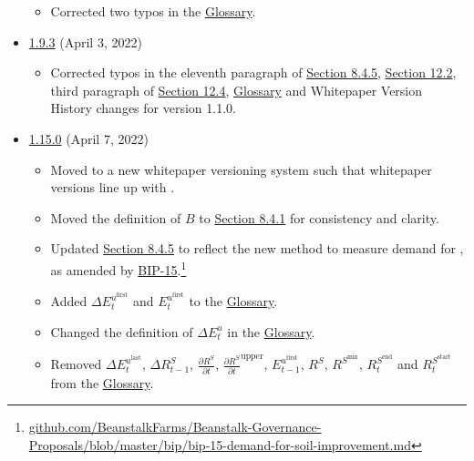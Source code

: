 \documentclass[class=article, crop=false]{standalone}
\begin{document}
\begin{itemize}[topsep=0pt, itemsep=3pt,leftmargin=16pt]
\begin{itemize}
        \item Corrected two typos in the \hyperlink{subsection.12.2}{Glossary}.
    \end{itemize}
         \item \href{https://github.com/BeanstalkFarms/Beanstalk/blob/master/version-history/beanstalk1_9_3.pdf}{1.9.3} (April 3, 2022)
    \begin{itemize}
        \item Corrected typos in the eleventh paragraph of \hyperlink{subsubsection.8.4.5}{Section 8.4.5}, \hyperlink{subsection.12.2}{Section 12.2}, third paragraph of \hyperlink{subsection.12.4}{Section 12.4}, \hyperlink{subsection.12.2}{Glossary} and Whitepaper Version History changes for version 1.1.0.
    \end{itemize}   
        \item \href{https://github.com/BeanstalkFarms/Beanstalk/blob/master/version-history/beanstalk1_15_0.pdf}{1.15.0} (April 7, 2022)
    \begin{itemize}
        \item Moved to a new whitepaper versioning system such that whitepaper versions line up with . 
        \item Moved the definition of $B$ to \hyperlink{subsubsection.8.4.1}{Section 8.4.1} for consistency and clarity. 
        \item Updated \hyperlink{subsubsection.8.4.5}{Section 8.4.5} to reflect the new method to measure demand for , as amended by \href{https://github.com/BeanstalkFarms/Beanstalk-Governance-Proposals/blob/master/bip/bip-15-demand-for-soil-improvement.md}{BIP-15}.\footnote{\href{https://github.com/BeanstalkFarms/Beanstalk-Governance-Proposals/blob/master/bip/bip-15-demand-for-soil-improvement.md}{github.com/BeanstalkFarms/Beanstalk-Governance-Proposals/blob/master/bip/bip-15-demand-for-soil-improvement.md}}
        \item Added  $\Delta E_{t}^{u^{\text{first}}}$ and $E_{t}^{u^{\text{first}}}$ to the \hyperlink{subsection.12.2}{Glossary}. 
        \item Changed the definition of $\Delta E_{t}^{u}$ in the \hyperlink{subsection.12.2}{Glossary}. 
        \item Removed $\Delta E_{t}^{u^{\text{last}}}$, $\Delta R_{t-1}^S$, $\frac{\partial R^S}{\partial t}$, $\frac{\partial R^S}{\partial t}^{\text{upper}}$, $E_{t-1}^{u^{\text{first}}}$, $R^S$, $R^{S^{\text{min}}}$, $R_t^{S^{\text{end}}}$ and $R_t^{S^{\text{start}}}$ from the \hyperlink{subsection.12.2}{Glossary}.

\end{itemize}
\end{itemize}
\end{document}
